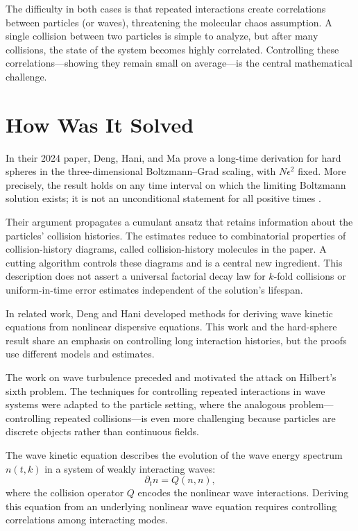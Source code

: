 The difficulty in both cases is that repeated interactions create correlations between particles (or waves), threatening the molecular chaos assumption. A single collision between two particles is simple to analyze, but after many collisions, the state of the system becomes highly correlated. Controlling these correlations---showing they remain small on average---is the central mathematical challenge.

\section{How Was It Solved}

In their 2024 paper, Deng, Hani, and Ma prove a long-time derivation for hard spheres in the three-dimensional Boltzmann--Grad scaling, with $N\epsilon^2$ fixed. More precisely, the result holds on any time interval on which the limiting Boltzmann solution exists; it is not an unconditional statement for all positive times \cite{denghanima2024}.

Their argument propagates a cumulant ansatz that retains information about the particles' collision histories. The estimates reduce to combinatorial properties of collision-history diagrams, called collision-history molecules in the paper. A cutting algorithm controls these diagrams and is a central new ingredient. This description does not assert a universal factorial decay law for $k$-fold collisions or uniform-in-time error estimates independent of the solution's lifespan.

In related work, Deng and Hani developed methods for deriving wave kinetic equations from nonlinear dispersive equations. This work and the hard-sphere result share an emphasis on controlling long interaction histories, but the proofs use different models and estimates.

The work on wave turbulence preceded and motivated the attack on Hilbert's sixth problem. The techniques for controlling repeated interactions in wave systems were adapted to the particle setting, where the analogous problem---controlling repeated collisions---is even more challenging because particles are discrete objects rather than continuous fields.

The wave kinetic equation describes the evolution of the wave energy spectrum $n(t,k)$ in a system of weakly interacting waves:
\[
\partial_t n = Q(n,n),
\]
where the collision operator $Q$ encodes the nonlinear wave interactions. Deriving this equation from an underlying nonlinear wave equation requires controlling correlations among interacting modes.

